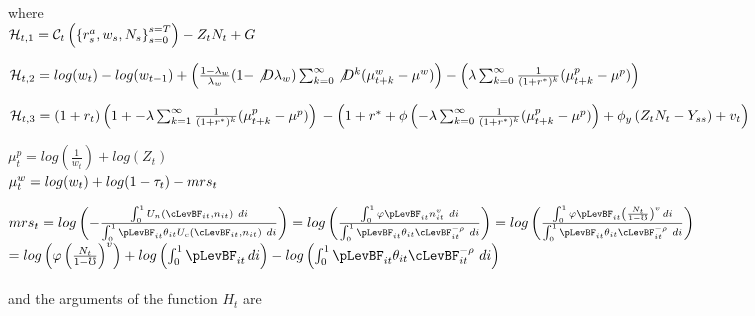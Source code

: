 \documentclass[titlepage]{\econtex}\providecommand{\texname}{FBS-NK}
\begin{document}
 where \\ 
 
 
 $\mathcal{H}_{t,1}  =\mathcal{C}_{t}\left( \left \{r^{a}_{s} , w_{s} , N_{s}  \right \}_{s=0}^{s=T} \right) - Z_{t} N_{t} + G\\ \\ $

$ \mathcal{H}_{t,2}  =log(w_{t}) - log(w_{t-1}) + \left( \frac{1 - \lambda_{w}}{\lambda_{w}}(1 - \not D \lambda_{w}) \sum_{k=0}^{\infty} \not D^{k} ( \mu_{t+k}^{w} - \mu^{w}) \right) - \left(  \lambda \sum_{k=0}^{\infty} \frac{1}{(1+r^{*})^{k}} ( \mu_{t+k}^{p} - \mu^{p})\right)\\ \\ $

$ \mathcal{H}_{t,3}  =  (1+r_{t}) \left(1+ -\lambda \sum_{k=1}^{\infty} \frac{1}{(1+r^{*})^{k}} ( \mu_{t+k}^{p} - \mu^{p}) \right) \\ \\
 - \left(1+r^{*}+ \phi \left(- \lambda \sum_{k=0}^{\infty} \frac{1}{(1+r^{*})^{k}} ( \mu_{t+k}^{p} - \mu^{p}) \right) +\phi_{y} \left(Z_{t} N_{t} - Y_{ss} \right) + v_{t}\right) \\ \\ $
 
$ \mu_{t}^{p} = log(\frac{1}{w_{t}}) + log(Z_{t})$ \\ 

$\mu_{t}^{w} = log(w_{t}) + log(1 - \tau_{t}) - mrs_{t} \\  $

$mrs_{t} = log \left(- \frac{\int_{0}^{1}   U_{n} \left(\cLevBF_{i t}, n_{i t} \right) \ d i  }{\int_{0}^{1} \pLevBF_{it} \theta_{it} U_{c} \left(\cLevBF_{i t}, n_{i t} \right) \  di } \right) = log \left(\frac{\int_{0}^{1} \varphi \pLevBF_{it} n_{it}^{v} \ d i  }{\int_{0}^{1} \pLevBF_{it}  \theta_{it} \cLevBF_{it}^{-\rho} \  di } \right) = log \left(\frac{\int_{0}^{1} \varphi \pLevBF_{it} \left(\frac{N_{t}}{1 - \mho} \right)^{v} \, d i  }{\int_{0}^{1} \pLevBF_{it}  \theta_{it} \cLevBF_{it}^{-\rho} \  di } \right)$ \\ 

$ = log \left( \varphi \left(\frac{N_{t}}{1 - \mho}\right) ^{v}\right) + log \left(\int_{0}^{1} \pLevBF_{it}  \,  di  \right) - log \left(\int_{0}^{1} \pLevBF_{it}  \theta_{it} \cLevBF_{it}^{-\rho} \  di  \right) $ \\ \\
 
 and the arguments of the function $H_{t}$ are \\
 
\end{document}
